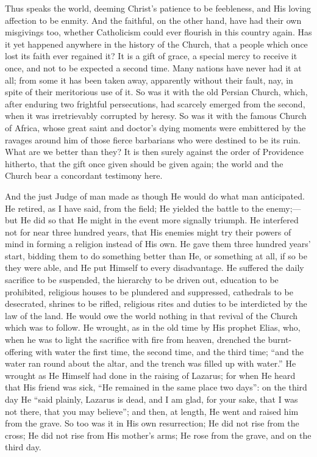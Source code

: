 Thus speaks the world, deeming Christ's patience to be
feebleness, and His loving affection to be enmity. And
the faithful, on the other hand, have had their own
misgivings too, whether Catholicism could ever flourish
in this country again. Has it yet happened anywhere in
the history of the Church, that a people which once lost
its faith ever regained it? It is a gift of grace, a
special mercy to receive it once, and not to be expected
a second time. Many nations have never had it at all;
from some it has been taken away, apparently without
their fault, nay, in spite of their meritorious use of
it. So was it with the old Persian Church, which, after
enduring two frightful persecutions, had scarcely emerged
from the second, when it was irretrievably corrupted by
heresy. So was it with the famous Church of Africa, whose
great saint and doctor's dying moments were embittered by
the ravages around him of those fierce barbarians who
were destined to be its ruin. What are we better than
they? It is then surely against the order of Providence
hitherto, that the gift once given should be given again;
the world and the Church bear a concordant testimony
here.

And the just Judge of man made as though He would do
what man anticipated. He retired, as I have said, from
the field; He yielded the battle to the enemy;—but
He did so that He might in the event more signally
triumph. He interfered not for near three hundred years,
that His enemies might try their powers of mind in
forming a religion instead of His own. He gave them three
hundred years' start, bidding them to do something better
than He, or something at all, if so be they were able,
and He put Himself to every disadvantage. He suffered the
daily sacrifice to be suspended, the hierarchy to be
driven out, education to be prohibited, religious houses
to be plundered and suppressed, cathedrals to be
desecrated, shrines to be rifled, religious rites and
duties to be interdicted by the law of the land. He would
owe the world nothing in that revival of the Church which
was to follow. He wrought, as in the old time by His
prophet Elias, who, when he was to light the sacrifice
with fire from heaven, drenched the burnt-offering with
water the first time, the second time, and the third time;
``and the water ran round about the altar, and the
trench was filled up with water.'' He wrought as He
Himself had done in the raising of Lazarus; for when He
heard that His friend was sick, ``He remained in the
same place two days'': on the third day He ``said
plainly, Lazarus is dead, and I am glad, for your sake,
that I was not there, that you may believe''; and
then, at length, He went and raised him from the grave. So
too was it in His own resurrection; He did not rise from
the cross; He did not rise from His mother's arms; He
rose from the grave, and on the third day.

